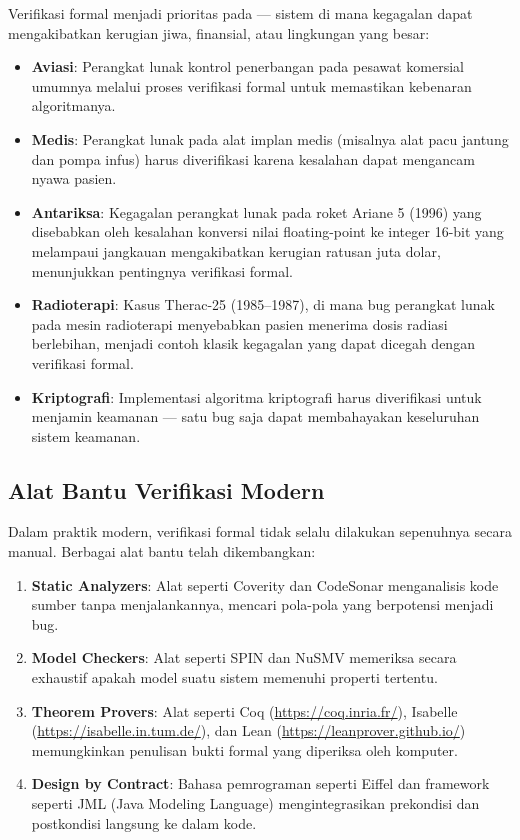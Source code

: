 Verifikasi formal menjadi prioritas pada  --- sistem di mana kegagalan dapat mengakibatkan kerugian jiwa, finansial, atau lingkungan yang besar:

\begin{itemize}
    \item \textbf{Aviasi}: Perangkat lunak kontrol penerbangan pada pesawat komersial umumnya melalui proses verifikasi formal untuk memastikan kebenaran algoritmanya.
    \item \textbf{Medis}: Perangkat lunak pada alat implan medis (misalnya alat pacu jantung dan pompa infus) harus diverifikasi karena kesalahan dapat mengancam nyawa pasien.
    \item \textbf{Antariksa}: Kegagalan perangkat lunak pada roket Ariane 5 (1996) yang disebabkan oleh kesalahan konversi nilai floating-point ke integer 16-bit yang melampaui jangkauan mengakibatkan kerugian ratusan juta dolar, menunjukkan pentingnya verifikasi formal.
    \item \textbf{Radioterapi}: Kasus Therac-25 (1985--1987), di mana bug perangkat lunak pada mesin radioterapi menyebabkan pasien menerima dosis radiasi berlebihan, menjadi contoh klasik kegagalan yang dapat dicegah dengan verifikasi formal.
    \item \textbf{Kriptografi}: Implementasi algoritma kriptografi harus diverifikasi untuk menjamin keamanan --- satu bug saja dapat membahayakan keseluruhan sistem keamanan.
\end{itemize}

\subsection{Alat Bantu Verifikasi Modern}

Dalam praktik modern, verifikasi formal tidak selalu dilakukan sepenuhnya secara manual. Berbagai alat bantu telah dikembangkan:

\begin{enumerate}
    \item \textbf{Static Analyzers}: Alat seperti Coverity dan CodeSonar menganalisis kode sumber tanpa menjalankannya, mencari pola-pola yang berpotensi menjadi bug.
    \item \textbf{Model Checkers}: Alat seperti SPIN dan NuSMV memeriksa secara exhaustif apakah model suatu sistem memenuhi properti tertentu.
    \item \textbf{Theorem Provers}: Alat seperti Coq (\url{https://coq.inria.fr/}), Isabelle (\url{https://isabelle.in.tum.de/}), dan Lean (\url{https://leanprover.github.io/}) memungkinkan penulisan bukti formal yang diperiksa oleh komputer.
    \item \textbf{Design by Contract}: Bahasa pemrograman seperti Eiffel dan framework seperti JML (Java Modeling Language) mengintegrasikan prekondisi dan postkondisi langsung ke dalam kode.
\end{enumerate}

